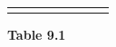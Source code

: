 {{\begin{center}
\begin{tabular}[t]{|l|l|l|l|l|l|l|l|}
    
         &
    
    
         &
    
    
         &
    
    
         &
    
    
         &
    
    
     \tabularnewline\cline{1-1}\cline{2-2}\cline{3-3}\cline{4-4}\cline{5-5}\cline{6-6}\cline{7-7}\cline{8-8}
    \end{tabular}
      \end{center}
    \begin{center}{\small\bfseries Table 9.1}\end{center}
    
    \addtocounter{footnote}{-0}
    
          }{ %
        
    
        \begin{center}
      

\end{center}}}
